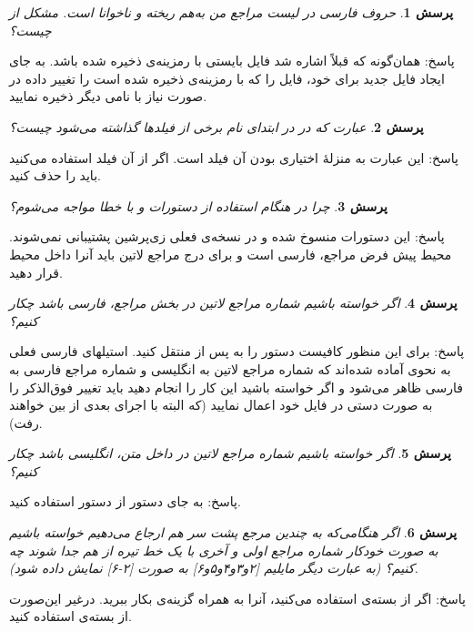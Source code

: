 \documentclass[a4paper]{article}
\theoremstyle{plain}\newtheorem{question}{پرسش}
\newcommand{\answer}{{\noindent \Sayeh پاسخ: }}
\newcommand\SLASH{\char`\\}
\begin{document}
\begin{question} حروف فارسی در لیست مراجع من به‌هم ریخته و ناخوانا است. مشکل از چیست؟ \end{question}
\answer همان‌گونه که قبلاً اشاره شد فایل  بایستی با رمزینه‌ی  ذخیره شده باشد. به جای ایجاد فایل  جدید برای خود، 
فایل  را که با رمزینه‌ی  ذخیره شده است را تغییر داده در صورت نیاز با نامی دیگر ذخیره نمایید. 

\begin{question} عبارت  که در  در ابتدای نام برخی از فیلدها گذاشته می‌شود چیست؟ \end{question}
\answer این عبارت به منزله‌ٔ اختیاری بودن آن فیلد است. اگر از آن فیلد استفاده می‌کنید باید  را حذف کنید.

\begin{question} چرا در هنگام استفاده از دستورات \lr{\SLASH Persian} و \lr{\SLASH Latin} با خطا مواجه می‌شوم؟ \end{question}
\answer این دستورات منسوخ شده و در نسخه‌‌ی فعلی زی‌پرشین پشتیبانی نمی‌شوند. محیط پیش فرض مراجع، فارسی است و برای درج مراجع لاتین باید آنرا داخل محیط  قرار دهید.

\begin{question} اگر خواسته باشیم شماره مراجع لاتین در بخش مراجع، فارسی باشد چکار کنیم؟ \end{question}
\answer برای این منظور کافیست دستور \lr{\SLASH resetlatinfont} را به پس از \lr{\SLASH bibitem} منتقل کنید.
 استیلهای فارسی فعلی به نحوی آماده شده‌اند که شماره مراجع لاتین به انگلیسی و شماره مراجع فارسی به فارسی ظاهر می‌شود و اگر خواسته باشید این کار را انجام دهید باید تغییر فوق‌الذکر را به صورت دستی در فایل  خود اعمال نمایید (که البته با اجرای  بعدی از بین خواهند رفت).
\begin{question} اگر خواسته باشیم شماره مراجع لاتین در داخل متن، انگلیسی باشد چکار کنیم؟ \end{question}
\answer به جای دستور \lr{\SLASH cite} از دستور \lr{\SLASH Latincite} استفاده کنید.
 
\begin{question} اگر هنگامی‌که به چندین مرجع پشت سر هم ارجاع می‌دهیم خواسته باشیم  به صورت خودکار شماره مراجع اولی و آخری با یک خط تیره از هم جدا شوند چه کنیم؟ 
(به عبارت دیگر مایلیم [۲و۳و۴و۵و۶] به صورت [۲-۶] نمایش داده شود).
 \end{question}
\answer اگر از بسته‌ی  استفاده می‌کنید، آنرا به همراه گزینه‌ی  بکار ببرید. درغیر این‌صورت از بسته‌ی  استفاده کنید.
\end{document}
